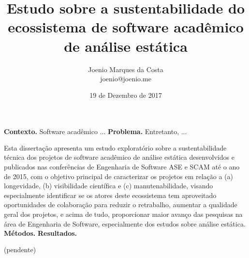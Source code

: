 \documentclass[msc, classic, a4paper]{ufbathesis}
\date{19 de Dezembro de 2017}
\title{
  Estudo sobre a sustentabilidade do ecossistema de software acadêmico de
  análise estática
}
\author{Joenio Marques da Costa\\
  {\small joenio@joenio.me}
}
\begin{document}
\frontpage
\frontmatter
\presentationpage

\resumo

\textbf{Contexto.} Software acadêmico ...
\textbf{Problema.} Entretanto, ... 

Esta dissertação apresenta um estudo exploratório sobre a sustentabilidade
técnica dos projetos de software acadêmico de análise estática desenvolvidos e
publicados nas conferências de Engenharia de Software ASE e SCAM até o ano de
2015, com o objetivo principal de caracterizar os projetos em relação a (a)
longevidade, (b) visibilidade científica e (c) manutenabilidade, visando
especialmente identificar se os atores deste ecossistema tem aproveitado
oportunidades de colaboração para reduzir o retrabalho, aumentar a qualidade
geral dos projetos, e acima de tudo, proporcionar maior avanço das pesquisas
na área de Engenharia de Software, especialmente dos estudos sobre análise
estática.
\textbf{Métodos.}
\textbf{Resultados.}


\begin{keywords}

  (pendente)

\end{keywords}

\tableofcontents
\listoffigures
\listoftables

\mainmatter






















\backmatter


\appendix


\end{document}
